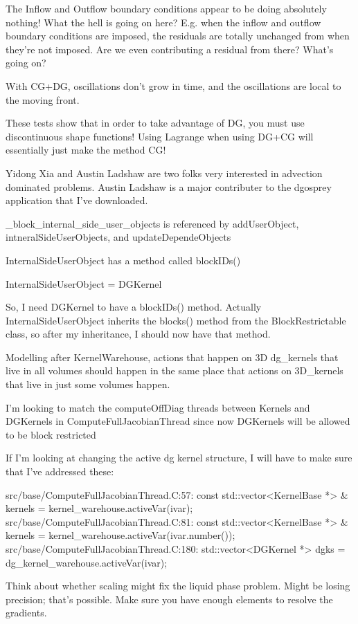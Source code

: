 {The Inflow and Outflow boundary conditions appear to be doing absolutely nothing! What the hell is going on here? E.g. when the inflow and outflow boundary conditions are imposed, the residuals are totally unchanged from when they're not imposed. Are we even contributing a residual from there? What's going on?

With CG+DG, oscillations don't grow in time, and the oscillations are local to the moving front.

These tests show that in order to take advantage of DG, you must use discontinuous shape functions! Using Lagrange when using DG+CG will essentially just make the method CG!

Yidong Xia and Austin Ladshaw are two folks very interested in advection dominated problems. Austin Ladshaw is a major contributer to the dgosprey application that I've downloaded.

_block_internal_side_user_objects is referenced by addUserObject, intneralSideUserObjects, and updateDependeObjects

InternalSideUserObject has a method called blockIDs()

InternalSideUserObject = DGKernel

So, I need DGKernel to have a blockIDs() method. Actually InternalSideUserObject inherits the blocks() method from the BlockRestrictable class, so after my inheritance, I should now have that method.

Modelling after KernelWarehouse, actions that happen on 3D dg_kernels that live in all volumes should happen in the same place that actions on 3D_kernels that live in just some volumes happen.

I'm looking to match the computeOffDiag threads between Kernels and DGKernels in ComputeFullJacobianThread since now DGKernels will be allowed to be block restricted

If I'm looking at changing the active dg kernel structure, I will have to make sure that I've addressed these:

src/base/ComputeFullJacobianThread.C:57:      const std::vector<KernelBase *> & kernels = kernel_warehouse.activeVar(ivar);
src/base/ComputeFullJacobianThread.C:81:        const std::vector<KernelBase *> & kernels = kernel_warehouse.activeVar(ivar.number());
src/base/ComputeFullJacobianThread.C:180:      std::vector<DGKernel *> dgks = dg_kernel_warehouse.activeVar(ivar);

Think about whether scaling might fix the liquid phase problem. Might be losing precision; that's possible. Make sure you have enough elements to resolve the gradients.

}
